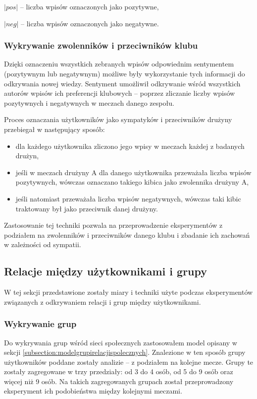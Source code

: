 $|pos|$ -- liczba wpisów oznaczonych jako pozytywne,

$|neg|$ -- liczba wpisów oznaczonych jako negatywne.



\subsubsection{Wykrywanie zwolenników i przeciwników klubu}
\label{subsubsection:wykrywaniezwolennikow}

Dzięki oznaczeniu wszystkich zebranych wpisów odpowiednim sentymentem
(pozytywnym lub negatywnym) możliwe były wykorzystanie tych informacji do
odkrywania nowej wiedzy. Sentyment umożliwił odkrywanie wśród wszystkich
autorów wpisów ich preferencji klubowych -- poprzez zliczanie liczby wpisów
pozytywnych i negatywnych w meczach danego zespołu.

Proces oznaczania użytkowników jako sympatyków i przeciwników drużyny przebiegał
w następujący sposób:
\begin{itemize}
  \item dla każdego użytkownika zliczono jego wpisy w meczach każdej z badanych 
  drużyn,
  \item jeśli w meczach drużyny A dla danego użytkownika przeważała liczba 
  wpisów pozytywnych, wówczas oznaczano takiego kibica jako zwolennika drużyny A,
  \item jeśli natomiast przeważała liczba wpisów negatywnych, wówczas taki kibic
  traktowany był jako przeciwnik danej drużyny.  
\end{itemize} 

Zastosowanie tej techniki pozwala na przeprowadzenie eksperymentów z podziałem
na zwolenników i przeciwników danego klubu i zbadanie ich zachowań w zależności
od sympatii.




\subsection{Relacje między użytkownikami i grupy}
\label{subsection:miary-relacje}
W tej sekcji przedstawione zostały miary i techniki użyte podczas eksperymentów
związanych z odkrywaniem relacji i grup między użytkownikami.

\subsubsection{Wykrywanie grup}
\label{subsubsection:koncepcja-wykrywaniegrup}
Do wykrywania grup wśród sieci społecznych zastosowałem model opisany w sekcji
\ref{subsection:modelgrupirelacjispolecznych}. Znalezione w ten sposób grupy
użytkowników poddane zostały analizie -- z podziałem na kolejne mecze.
Grupy te zostały zagregowane w trzy przedziały: od 3 do 4 osób, od 5 do 9 osób
oraz więcej niż 9 osób. Na takich zagregowanych grupach został przeprowadzony
eksperyment ich podobieństwa między kolejnymi meczami.

